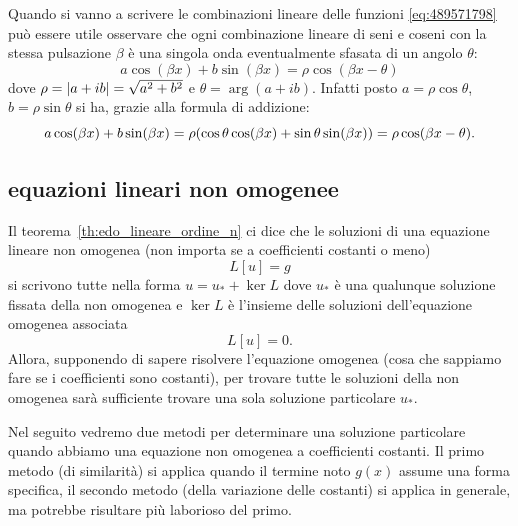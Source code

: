 % 
\begin{remark}
Quando si vanno a scrivere le combinazioni lineare delle funzioni 
\eqref{eq:489571798}
può essere utile osservare
che ogni combinazione lineare di seni e coseni
con la stessa pulsazione $\beta$ è una singola onda
eventualmente sfasata di un angolo $\theta$:
\[
  a \cos (\beta x) + b \sin (\beta x)
  =
  \rho \cos(\beta x - \theta)
\]
dove $\rho = {\left|a+ib\right|} = \sqrt{a^2+b^2}$ e 
$\theta=\arg(a+ib)$. 
Infatti
posto $a=\rho\cos \theta$, $b=\rho \sin \theta$ si ha,
grazie alla formula di addizione:
\[
   a \cos (\beta x) + b \sin (\beta x)
   = \rho{\left( \cos \theta \cos(\beta x) + \sin \theta \sin (\beta x) \right)}
   = \rho \cos(\beta x - \theta).
\]
\end{remark}

\subsection{equazioni lineari non omogenee}

Il teorema~\ref{th:edo_lineare_ordine_n}%
ci dice che le soluzioni di una 
 equazione lineare non omogenea (non importa se a coefficienti costanti o meno)
\[
  L[u]=g
\]
si scrivono tutte nella forma $u = u_* + \ker L$ dove 
$u_*$ è una qualunque soluzione fissata della non omogenea 
e $\ker L$ è l'insieme delle soluzioni dell'equazione omogenea 
associata 
\[
  L[u] =0. 
\]
Allora, supponendo di sapere risolvere l'equazione omogenea 
(cosa che sappiamo fare se i coefficienti sono costanti),
per trovare tutte le soluzioni della non omogenea sarà sufficiente 
trovare una sola soluzione particolare $u_*$.

Nel seguito vedremo due metodi per determinare una soluzione particolare 
quando abbiamo una equazione non omogenea a coefficienti costanti. 
Il primo metodo (di similarità) si applica quando il termine noto $g(x)$ assume una forma specifica,
il secondo metodo (della variazione delle costanti) si applica in generale, ma potrebbe risultare 
più laborioso del primo.

